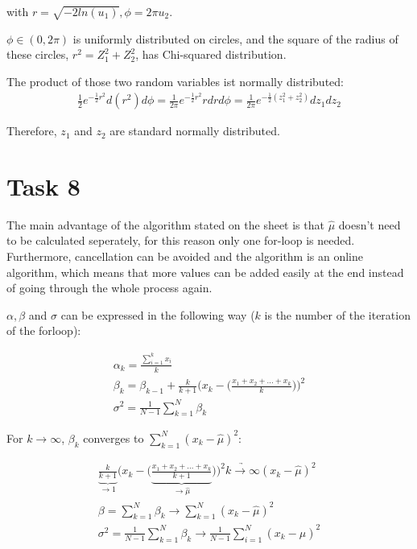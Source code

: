 \documentclass[10pt,a4paper]{article}
\begin{document}
with $r=\sqrt{-2ln(u_1)}, \phi=2\pi u_2$. 

$\phi\in (0,2\pi)$ is uniformly distributed on circles, and the square of the radius of these circles, $r^2=Z_1^2+Z_2^2$, has Chi-squared distribution.

The product of those two random variables ist normally distributed:
\begin{align*}
\frac{1}{2}e^{-\frac{1}{2}r^2}d(r^2)d\phi = \frac{1}{2\pi}e^{-\frac{1}{2}r^2}rdrd\phi = \frac{1}{2\pi}e^{-\frac{1}{2}(z_1^2+z_2^2)}dz_1dz_2
\end{align*} 

Therefore, $z_1$ and $z_2$ are standard normally distributed.

\section*{Task 8}

The main advantage of the algorithm stated on the sheet is that $\hat{\mu}$ doesn't need to be calculated seperately, for this reason only one for-loop is needed. Furthermore, cancellation can be avoided and the algorithm is an online algorithm, which means that more values can be added easily at the end instead of going through the whole process again.

$\alpha, \beta$ and $\sigma$ can be expressed in the following way ($k$ is the number of the iteration of the forloop):

\begin{gather*}
\alpha_k = \frac{\sum_{i=1}^k x_i}{k} \\
\beta_k = \beta_{k-1}+\frac{k}{k+1}\bigg(x_k-\bigg(\frac{x_1+x_2+...+x_{k}}{k}\bigg)\bigg)^2 \\
\sigma^2 = \frac{1}{N-1}\sum_{k=1}^N\beta_k
\end{gather*}

For $k \to \infty$, $\beta_k$ converges to $\sum_{k=1}^N (x_k-\hat{\mu})^2$:

\begin{gather*}
\underbrace{\frac{k}{k+1}}_{\to 1}\bigg(x_k-\bigg(\underbrace{\frac{x_1+x_2+...+x_{k}}{k+1}}_{\to \hat{\mu}}\bigg)\bigg)^2 \underrightarrow{k\to\infty} (x_k-\hat{\mu})^2 \\
\beta = \sum_{k=1}^N \beta_k \to \sum_{k=1}^N (x_k-\hat{\mu})^2 \\
\sigma^2 = \frac{1}{N-1}\sum_{k=1}^N\beta_k \to \frac{1}{N-1} \sum_{i=1}^N (x_k-\hat{\mu})^2 \\
\end{gather*}
\end{document}
